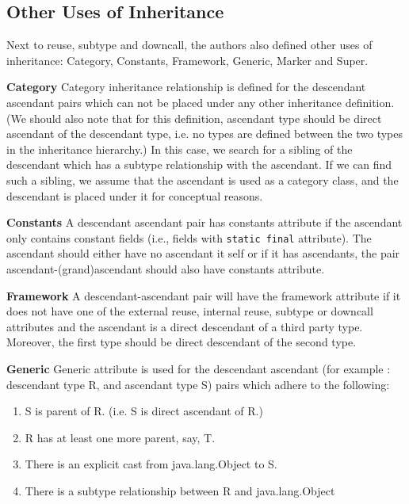 \documentclass [11pt, parskip=full] {article}
\begin{document}
\subsection{Other Uses of Inheritance}
Next to reuse, subtype and downcall, the authors also defined other uses of inheritance: Category, Constants, Framework, Generic, Marker and Super.
\begin{description}

\item{\bf{Category}}
Category inheritance relationship is defined for the descendant ascendant pairs which can not be placed under any other inheritance definition. (We should also note that for this definition, ascendant type should be direct ascendant of the descendant type, i.e. no types are defined between the two types in the inheritance hierarchy.) In this case, we search for a sibling of the descendant which has a subtype relationship with the ascendant. If we can find such a sibling, we assume that the ascendant is used as a category class, and the descendant is placed under it for conceptual reasons. 

\item{\bf{Constants}}
A descendant ascendant pair has constants attribute if the ascendant only contains constant fields (i.e., fields with \texttt{static final} attribute). The ascendant should either have no ascendant it self or if it has ascendants, the pair ascendant-(grand)ascendant should also have constants attribute. 

\item{\bf{Framework}}
A descendant-ascendant pair will have the framework attribute if it does not have one of the external reuse, internal reuse, subtype or downcall attributes and the ascendant is a direct descendant of a third party type. Moreover, the first type should be direct descendant of the second type. 

\item{\bf{Generic}}
Generic attribute is used for the descendant ascendant (for example : descendant type R, and ascendant type S) pairs which adhere to the following:
\begin{enumerate}
  \item S is parent of R. (i.e. S is direct ascendant of R.)
  \item R has at least one more parent, say, T.
  \item There is an explicit cast from java.lang.Object to S. 
  \item There is a subtype relationship between R and java.lang.Object
\end{enumerate}


\end{description}
\end{document}
